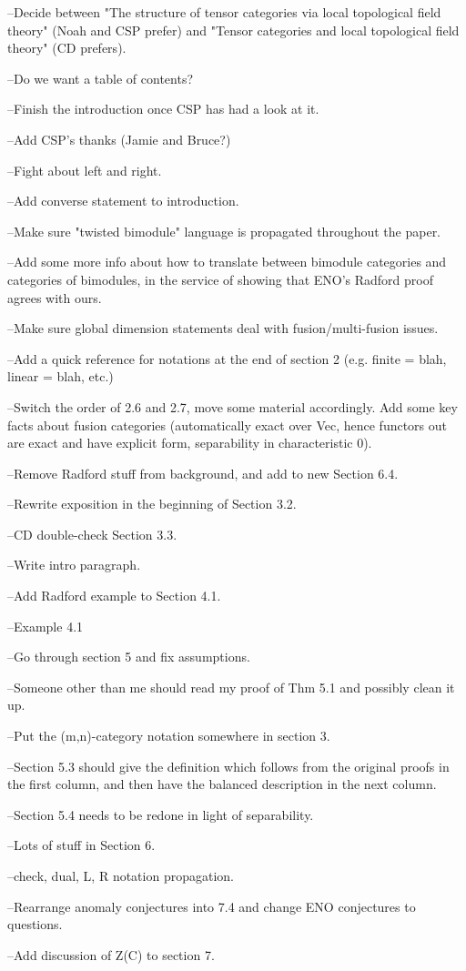 --Decide between "The structure of tensor categories via local topological field theory" (Noah and CSP prefer) and "Tensor categories and local topological field theory" (CD prefers).

--Do we want a table of contents?

--Finish the introduction once CSP has had a look at it.

--Add CSP's thanks (Jamie and Bruce?)

--Fight about left and right.

--Add converse statement to introduction.

--Make sure "twisted bimodule" language is propagated throughout the paper.

--Add some more info about how to translate between bimodule categories and categories of bimodules, in the service of showing that ENO's Radford proof agrees with ours.

--Make sure global dimension statements deal with fusion/multi-fusion issues.

--Add a quick reference for notations at the end of section 2 (e.g. finite = blah, linear = blah, etc.)

--Switch the order of 2.6 and 2.7, move some material accordingly.  Add some key facts about fusion categories (automatically exact over Vec, hence functors out are exact and have explicit form, separability in characteristic 0).

--Remove Radford stuff from background, and add to new Section 6.4.

--Rewrite exposition in the beginning of Section 3.2.

--CD double-check Section 3.3.

--Write intro paragraph.

--Add Radford example to Section 4.1.

--Example 4.1

--Go through section 5 and fix assumptions.

--Someone other than me should read my proof of Thm 5.1 and possibly clean it up.

--Put the (m,n)-category notation somewhere in section 3.

--Section 5.3 should give the definition which follows from the original proofs in the first column, and then have the balanced description in the next column.

--Section 5.4 needs to be redone in light of separability.

--Lots of stuff in Section 6.

--check, dual, L, R notation propagation.

--Rearrange anomaly conjectures into 7.4 and change ENO conjectures to questions.

--Add discussion of Z(C) to section 7.